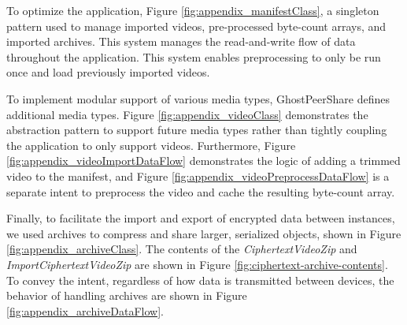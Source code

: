 \documentclass [11pt, proquest] {uwthesis}[2020/02/24]
\begin{document}
To optimize the application, Figure \ref{fig:appendix_manifestClass}, a singleton pattern used to manage imported videos, pre-processed byte-count arrays, and imported archives. This system manages the read-and-write flow of data throughout the application. This system enables preprocessing to only be run once and load previously imported videos.

To implement modular support of various media types, GhostPeerShare defines additional media types. Figure \ref{fig:appendix_videoClass} demonstrates the abstraction pattern to support future media types rather than tightly coupling the application to only support videos. Furthermore, Figure \ref{fig:appendix_videoImportDataFlow} demonstrates the logic of adding a trimmed video to the manifest, and Figure \ref{fig:appendix_videoPreprocessDataFlow} is a separate intent to preprocess the video and cache the resulting byte-count array.

Finally, to facilitate the import and export of encrypted data between instances, we used archives to compress and share larger, serialized objects, shown in Figure \ref{fig:appendix_archiveClass}. 
The contents of the \textit{CiphertextVideoZip} and \textit{ImportCiphertextVideoZip} are shown in Figure \ref{fig:ciphertext-archive-contents}.
To convey the intent, regardless of how data is transmitted between devices, the behavior of handling archives are shown in Figure \ref{fig:appendix_archiveDataFlow}.
\end{document}
